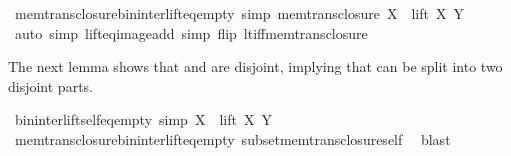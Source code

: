 \begin{isabellebody}
%
\isadelimproof
\isanewline
%
\endisadelimproof
\isanewline
{}\isamarkupfalse%
\ mem{\isacharunderscore}{\kern0pt}trans{\isacharunderscore}{\kern0pt}closure{\isacharunderscore}{\kern0pt}bin{\isacharunderscore}{\kern0pt}inter{\isacharunderscore}{\kern0pt}lift{\isacharunderscore}{\kern0pt}eq{\isacharunderscore}{\kern0pt}empty\ {\isacharbrackleft}{\kern0pt}simp{\isacharbrackright}{\kern0pt}{\isacharcolon}{\kern0pt}\ {\isachardoublequoteopen}mem{\isacharunderscore}{\kern0pt}trans{\isacharunderscore}{\kern0pt}closure\ X\ {\isasyminter}\ lift\ X\ Y\ {\isacharequal}{\kern0pt}\ {\isacharbraceleft}{\kern0pt}{\isacharbraceright}{\kern0pt}{\isachardoublequoteclose}\isanewline
%
\isadelimproof
\ \ %
\endisadelimproof
%
\isatagproof
{}\isamarkupfalse%
\ {\isacharparenleft}{\kern0pt}auto\ simp{\isacharcolon}{\kern0pt}\ lift{\isacharunderscore}{\kern0pt}eq{\isacharunderscore}{\kern0pt}image{\isacharunderscore}{\kern0pt}add\ simp\ flip{\isacharcolon}{\kern0pt}\ lt{\isacharunderscore}{\kern0pt}iff{\isacharunderscore}{\kern0pt}mem{\isacharunderscore}{\kern0pt}trans{\isacharunderscore}{\kern0pt}closure{\isacharparenright}{\kern0pt}%
\endisatagproof
{\isafoldproof}%
%
\isadelimproof
%
\endisadelimproof
%
\begin{isamarkuptext}%
The next lemma shows that  and  are disjoint, 
implying that  can be split into two disjoint parts.%
\end{isamarkuptext}\isamarkuptrue%
\isamarkupfalse%
\ bin{\isacharunderscore}{\kern0pt}inter{\isacharunderscore}{\kern0pt}lift{\isacharunderscore}{\kern0pt}self{\isacharunderscore}{\kern0pt}eq{\isacharunderscore}{\kern0pt}empty\ {\isacharbrackleft}{\kern0pt}simp{\isacharbrackright}{\kern0pt}{\isacharcolon}{\kern0pt}\ {\isachardoublequoteopen}X\ {\isasyminter}\ lift\ X\ Y\ {\isacharequal}{\kern0pt}\ {\isacharbraceleft}{\kern0pt}{\isacharbraceright}{\kern0pt}{\isachardoublequoteclose}\isanewline
%
\isadelimproof
\ \ %
\endisadelimproof
%
\isatagproof
{}\isamarkupfalse%
\ mem{\isacharunderscore}{\kern0pt}trans{\isacharunderscore}{\kern0pt}closure{\isacharunderscore}{\kern0pt}bin{\isacharunderscore}{\kern0pt}inter{\isacharunderscore}{\kern0pt}lift{\isacharunderscore}{\kern0pt}eq{\isacharunderscore}{\kern0pt}empty\ subset{\isacharunderscore}{\kern0pt}mem{\isacharunderscore}{\kern0pt}trans{\isacharunderscore}{\kern0pt}closure{\isacharunderscore}{\kern0pt}self\ \isamarkupfalse%
\ blast%
\endisatagproof
{\isafoldproof}%
%
\isadelimproof
\isanewline

\end{isabellebody}
